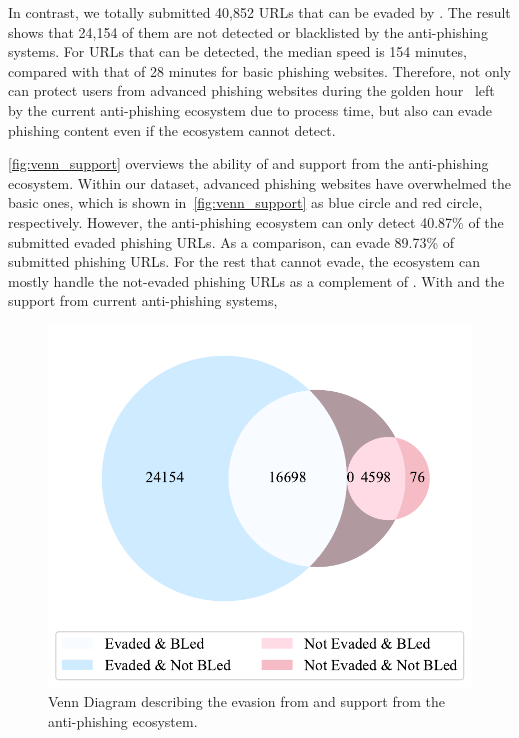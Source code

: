 In contrast, we totally submitted 40,852 URLs that can be evaded by \spartacus.
The result shows that 24,154 of them are not detected or blacklisted by the anti-phishing systems.
For URLs that can be detected, the median speed is 154 minutes, compared with that of 28 minutes for basic phishing websites.
Therefore, \spartacus not only can protect users from advanced phishing websites during the golden hour~\cite{oest2020sunrise} left by the current anti-phishing ecosystem due to process time, but also can evade phishing content even if the ecosystem cannot detect.

\autoref{fig:venn_support} overviews the ability of \spartacus and support from the anti-phishing ecosystem.
Within our dataset, advanced phishing websites have overwhelmed the basic ones, which is shown in~\autoref{fig:venn_support} as blue circle and red circle, respectively.
However, the anti-phishing ecosystem can only detect 40.87\% of the submitted evaded phishing URLs.
As a comparison, \spartacus can evade 89.73\% of submitted phishing URLs.
For the rest that \spartacus cannot evade,
the ecosystem can mostly handle the not-evaded phishing URLs as a complement of \spartacus.
With \spartacus and the support from current anti-phishing systems, 



\begin{figure}
\centering
\includegraphics[width=\linewidth]{figs/venn_eval_3.pdf}
\caption{Venn Diagram describing the evasion from \spartacus and support from the anti-phishing ecosystem.}
\label{fig:venn_support}
\end{figure}

